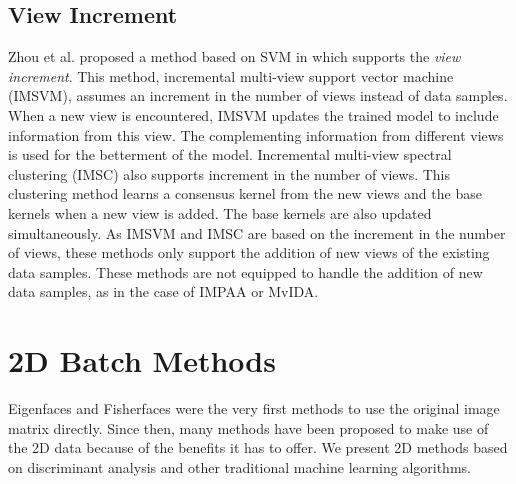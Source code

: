 \subsection{View Increment}
\label{Lit_MvInc_View}
Zhou et al. proposed a method based on SVM in \cite{ZhouSDY19} which supports the \textit{view increment}. This method, incremental multi-view support vector machine (IMSVM), assumes an increment in the number of views instead of data samples. When a new view is encountered, IMSVM updates the trained model to include information from this view. The complementing information from different views is used for the betterment of the model. Incremental multi-view spectral clustering (IMSC) \cite{ZhouSDYL19} also supports increment in the number of views. This clustering method learns a consensus kernel from the new views and the base kernels when a new view is added. The base kernels are also updated simultaneously. As IMSVM and IMSC are based on the increment in the number of views, these methods only support the addition of new views of the existing data samples. These methods are not equipped to handle the addition of new data samples, as in the case of IMPAA or MvIDA.











\section{2D Batch Methods}
\label{sec:Lit_2D}
Eigenfaces \cite{TurkP91} and Fisherfaces \cite{BelhumeurKH96} were the very first methods to use the original image matrix directly. Since then, many methods have been proposed to make use of the 2D data because of the benefits it has to offer. We present 2D methods based on discriminant analysis and other traditional machine learning algorithms.


